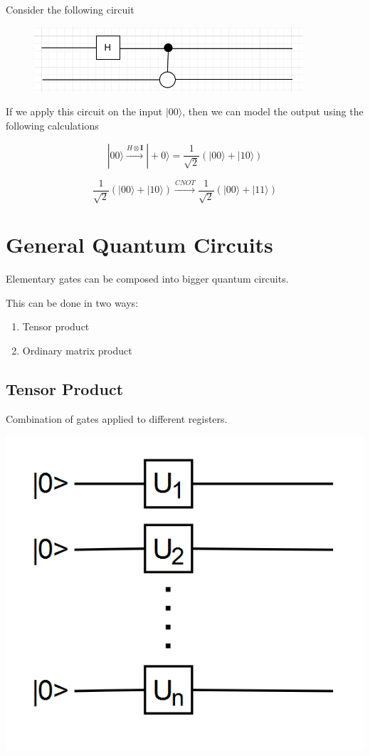 \documentclass{article}
\begin{document}
Consider the following circuit

\begin{figure}[htp]
	\centering
	\includegraphics[width=10cm]{extwoqubit.png}
\end{figure}

If we apply this circuit on the input $|00\rangle$, then we can model the output using the following calculations

$$|00\rangle \xrightarrow[]{H \otimes \mathbf{I}} |+0\rangle = \frac{1}{\sqrt{2}}(|00\rangle + |10\rangle)$$

$$\frac{1}{\sqrt{2}}(|00\rangle + |10\rangle) \xrightarrow[]{CNOT} \frac{1}{\sqrt{2}}(|00\rangle + |11\rangle)$$

\section{General Quantum Circuits}
Elementary gates can be composed into bigger quantum circuits.

This can be done in two ways:
\begin{enumerate}
    \item Tensor product
    \item Ordinary matrix product
\end{enumerate}

\subsection{Tensor Product}
Combination of gates applied to different registers.

\includegraphics[scale=0.5]{q1.png}
\end{document}

